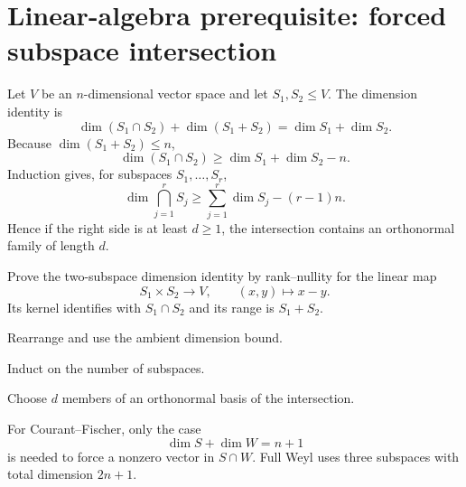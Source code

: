 \section{Linear-algebra prerequisite: forced subspace intersection}


Let $V$ be an $n$-dimensional vector space and let $S_1,S_2\le V$. The dimension identity is
\begin{equation}
  \dim(S_1\cap S_2)+\dim(S_1+S_2)=\dim S_1+\dim S_2. \tag{HJ-0.1.7.1}
\end{equation}
Because $\dim(S_1+S_2)\le n$,
\begin{equation}
  \dim(S_1\cap S_2)
  \ge \dim S_1+\dim S_2-n. \tag{HJ-0.1.7.2}
\end{equation}
Induction gives, for subspaces $S_1,\dots,S_r$,
\begin{equation}
  \dim\bigcap_{j=1}^r S_j
  \ge \sum_{j=1}^r\dim S_j-(r-1)n. \tag{HJ-0.1.7.3}
\end{equation}
Hence if the right side is at least $d\ge1$, the intersection contains an orthonormal family of length $d$.

\begin{proofoutline}
\item Prove the two-subspace dimension identity by rank--nullity for the linear map
\[
  S_1\times S_2\longrightarrow V,
  \qquad (x,y)\longmapsto x-y.
\]
Its kernel identifies with $S_1\cap S_2$ and its range is $S_1+S_2$.
\item Rearrange and use the ambient dimension bound.
\item Induct on the number of subspaces.
\item Choose $d$ members of an orthonormal basis of the intersection.
\end{proofoutline}

For Courant--Fischer, only the case
\[
  \dim S+\dim W=n+1
\]
is needed to force a nonzero vector in $S\cap W$. Full Weyl uses three subspaces with total dimension $2n+1$.


